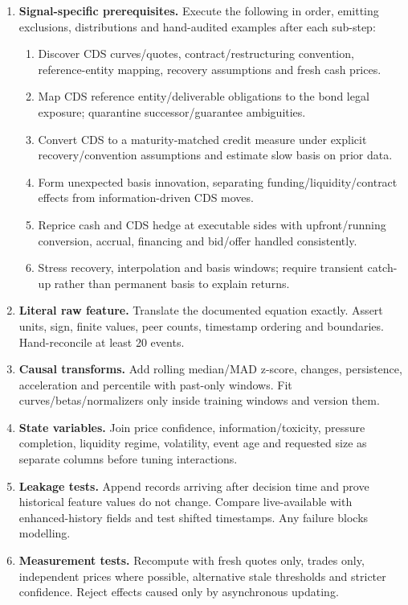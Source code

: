 \documentclass[10pt]{article}
\begin{document}
\begin{enumerate}[leftmargin=2em,label=\textbf{A\arabic*.}]
\item \textbf{Signal-specific prerequisites.} Execute the following in order, emitting exclusions, distributions and hand-audited examples after each sub-step:
\begin{enumerate}[label=\alph*)]
\item Discover CDS curves/quotes, contract/restructuring convention, reference-entity mapping, recovery assumptions and fresh cash prices.
\item Map CDS reference entity/deliverable obligations to the bond legal exposure; quarantine successor/guarantee ambiguities.
\item Convert CDS to a maturity-matched credit measure under explicit recovery/convention assumptions and estimate slow basis on prior data.
\item Form unexpected basis innovation, separating funding/liquidity/contract effects from information-driven CDS moves.
\item Reprice cash and CDS hedge at executable sides with upfront/running conversion, accrual, financing and bid/offer handled consistently.
\item Stress recovery, interpolation and basis windows; require transient catch-up rather than permanent basis to explain returns.
\end{enumerate}
\item \textbf{Literal raw feature.} Translate the documented equation exactly. Assert units, sign, finite values, peer counts, timestamp ordering and boundaries. Hand-reconcile at least 20 events.
\item \textbf{Causal transforms.} Add rolling median/MAD z-score, changes, persistence, acceleration and percentile with past-only windows. Fit curves/betas/normalizers only inside training windows and version them.
\item \textbf{State variables.} Join price confidence, information/toxicity, pressure completion, liquidity regime, volatility, event age and requested size as separate columns before tuning interactions.
\item \textbf{Leakage tests.} Append records arriving after decision time and prove historical feature values do not change. Compare live-available with enhanced-history fields and test shifted timestamps. Any failure blocks modelling.
\item \textbf{Measurement tests.} Recompute with fresh quotes only, trades only, independent prices where possible, alternative stale thresholds and stricter confidence. Reject effects caused only by asynchronous updating.

\end{enumerate}
\end{document}
